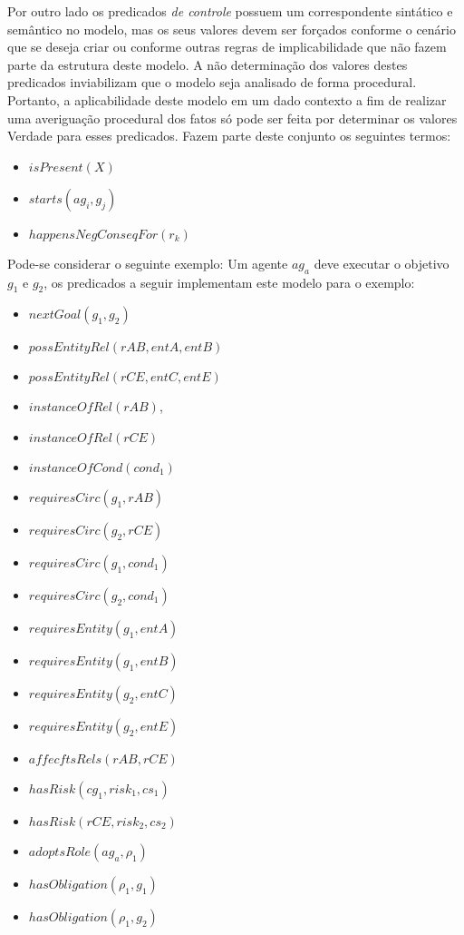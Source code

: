 Por outro lado os predicados \textit{de controle} possuem um correspondente sintático e semântico no modelo, mas os seus valores devem ser forçados conforme o cenário que se deseja criar ou conforme outras regras de implicabilidade que não fazem parte da estrutura deste modelo. A não determinação dos valores destes predicados inviabilizam que o modelo seja analisado de forma procedural. Portanto, a aplicabilidade deste modelo em um dado contexto a fim de realizar uma averiguação procedural dos fatos só pode ser feita por determinar os valores Verdade para esses predicados. Fazem parte deste conjunto os seguintes termos: 

\begin{itemize}
    \item $isPresent(X)$
    \item $starts(ag_i,g_j)$
    \item $happensNegConseqFor(r_k)$
\end{itemize}

Pode-se considerar o seguinte exemplo: Um agente $ag_a$ deve executar o objetivo $g_1$ e $g_2$, os predicados a seguir implementam este modelo para o exemplo:

\begin{itemize}
    \item $nextGoal(g_1,g_2)$
    \item $possEntityRel(rAB,entA,entB)$
    \item $possEntityRel(rCE,entC,entE)$
    \item $instanceOfRel(rAB)$,
    \item $instanceOfRel(rCE) $
    \item $instanceOfCond(cond_1)$
    \item $requiresCirc(g_1,rAB)$
    \item $requiresCirc(g_2,rCE)$
    \item $requiresCirc(g_1,cond_1)$
    \item $requiresCirc(g_2,cond_1)$    
    \item $requiresEntity(g_1,entA)$
    \item $requiresEntity(g_1,entB)$
    \item $requiresEntity(g_2,entC)$
    \item $requiresEntity(g_2,entE)$            
    \item $affecftsRels(rAB,rCE) $ 
    \item $hasRisk(cg_1,risk_1,cs_1)$
    \item $hasRisk(rCE,risk_2,cs_2)$
    \item $adoptsRole(ag_a,\rho_1)$
    \item $hasObligation(\rho_1,g_1)$
    \item $hasObligation(\rho_1,g_2)$
\end{itemize}

